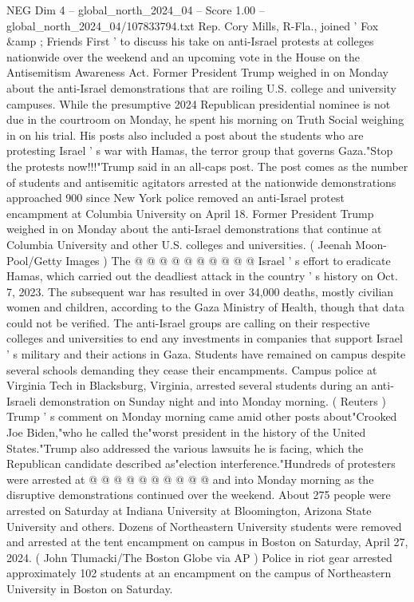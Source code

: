 \begin{textsample}{NEG Dim 4 – global\_north\_2024\_04 – Score 1.00 – global\_north\_2024\_04/107833794.txt}  \label{ex:f4_neg_093}
Rep.
Cory Mills, R-Fla., joined ' Fox \&amp ; Friends First ' to discuss his take on anti-Israel protests at colleges nationwide over the weekend and an upcoming vote in the House on the Antisemitism Awareness Act.
Former President Trump weighed in on Monday about the anti-Israel demonstrations that are roiling U.S. college and university campuses.
While the presumptive 2024 Republican presidential nominee is not due in the courtroom on Monday, he spent his morning on Truth Social weighing in on his trial.
His posts also included a post about the students who are protesting Israel ' s war with Hamas, the terror group that governs Gaza."Stop the protests now!!!"Trump said in an all-caps post.
The post comes as the number of students and antisemitic agitators arrested at the nationwide demonstrations approached 900 since New York police removed an anti-Israel protest encampment at Columbia University on April 18.
Former President Trump weighed in on Monday about the anti-Israel demonstrations that continue at Columbia University and other U.S. colleges and universities. ( Jeenah Moon-Pool/Getty Images ) The @ @ @ @ @ @ @ @ @ @ Israel ' s effort to eradicate Hamas, which carried out the deadliest attack in the country ' s history on Oct. 7, 2023.
The subsequent war has resulted in over 34,000 deaths, mostly civilian women and children, according to the Gaza Ministry of Health, though that data could not be verified.
The anti-Israel groups are calling on their respective colleges and universities to end any investments in companies that support Israel ' s military and their actions in Gaza.
Students have remained on campus despite several schools demanding they cease their encampments.
Campus police at Virginia Tech in Blacksburg, Virginia, arrested several students during an anti-Israeli demonstration on Sunday night and into Monday morning. ( Reuters ) Trump ' s comment on Monday morning came amid other posts about"Crooked Joe Biden,"who he called the"worst president in the history of the United States."Trump also addressed the various lawsuits he is facing, which the Republican candidate described as"election interference."Hundreds of protesters were arrested at @ @ @ @ @ @ @ @ @ @ and into Monday morning as the disruptive demonstrations continued over the weekend.
About 275 people were arrested on Saturday at Indiana University at Bloomington, Arizona State University and others.
Dozens of Northeastern University students were removed and arrested at the tent encampment on campus in Boston on Saturday, April 27, 2024. ( John Tlumacki/The Boston Globe via AP ) Police in riot gear arrested approximately 102 students at an encampment on the campus of Northeastern University in Boston on Saturday.

\end{textsample}
